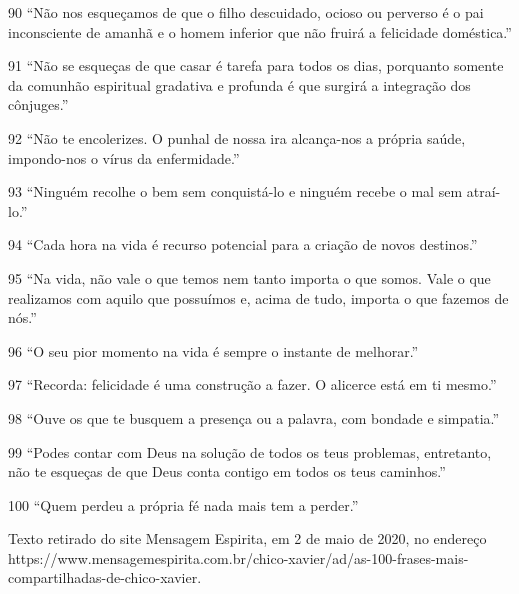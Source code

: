 90 ``Não nos esqueçamos de que o filho descuidado, ocioso ou perverso é o pai inconsciente de amanhã e o homem inferior que não fruirá a felicidade doméstica.”

91 ``Não se esqueças de que casar é tarefa para todos os dias, porquanto somente da comunhão espiritual gradativa e profunda é que surgirá a integração dos cônjuges.”

92 ``Não te encolerizes. O punhal de nossa ira alcança-nos a própria saúde, impondo-nos o vírus da enfermidade.”

93 ``Ninguém recolhe o bem sem conquistá-lo e ninguém recebe o mal sem atraí-lo.”

94 ``Cada hora na vida é recurso potencial para a criação de novos destinos.”

95 ``Na vida, não vale o que temos nem tanto importa o que somos. Vale o que realizamos com aquilo que possuímos e, acima de tudo, importa o que fazemos de nós.”

96 ``O seu pior momento na vida é sempre o instante de melhorar.”

97 ``Recorda: felicidade é uma construção a fazer. O alicerce está em ti mesmo.”

98 ``Ouve os que te busquem a presença ou a palavra, com bondade e simpatia.”

99 ``Podes contar com Deus na solução de todos os teus problemas, entretanto, não te esqueças de que Deus conta contigo em todos os teus caminhos.”

100 ``Quem perdeu a própria fé nada mais tem a perder.”

\emdash{}Texto retirado do site Mensagem Espirita, em 2 de maio de 2020, no endereço https://www.mensagemespirita.com.br/chico-xavier/ad/as-100-frases-mais-compartilhadas-de-chico-xavier.